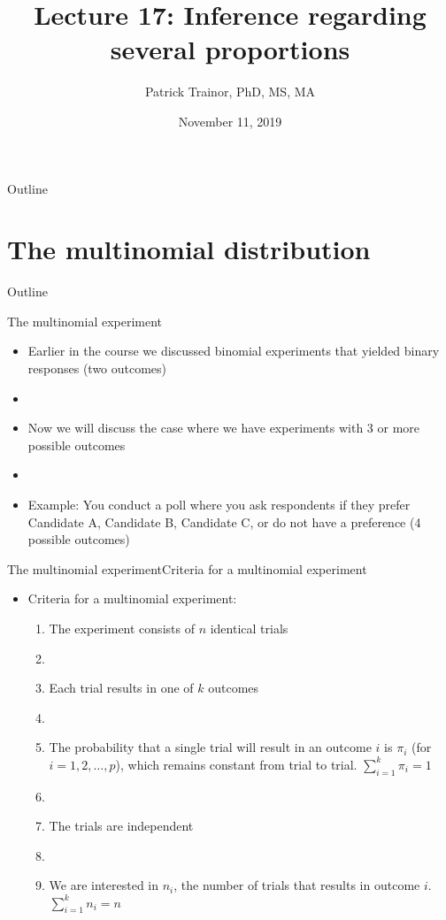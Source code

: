 \documentclass[xcolor=dvipsnames]{beamer}
\title[Lecture 17]{Lecture 17: Inference regarding several proportions}
\author[Patrick Trainor]{Patrick Trainor, PhD, MS, MA}
\institute[NMSU]{New Mexico State University}
\date{November 11, 2019}
\begin{document}
\begin{frame}
\maketitle
\end{frame}

\begin{frame}{Outline}
\tableofcontents[hideallsubsections]
\end{frame}

\section{The multinomial distribution}
\begin{frame}{Outline}
\tableofcontents[currentsection,subsectionstyle=show/shaded/hide]
\end{frame}

\begin{frame}{The multinomial experiment}
	\begin{itemize}
		\item Earlier in the course we discussed binomial experiments that yielded binary responses (two outcomes) \pause
		\item[]
		\item Now we will discuss the case where we have experiments with 3 or more possible outcomes \pause
		\item[]
		\item Example: You conduct a poll where you ask respondents if they prefer Candidate A, Candidate B, Candidate C, or do not have a preference (4 possible outcomes)
	\end{itemize}
\end{frame}

\begin{frame}{The multinomial experiment}{Criteria for a multinomial experiment}
	\begin{itemize}
		\item Criteria for a multinomial experiment: \pause
		\begin{enumerate}
			\item The experiment consists of $n$ identical trials \pause
			\item[]
			\item Each trial results in one of $k$ outcomes \pause
			\item[]
			\item The probability that a single trial will result in an outcome $i$ is $\pi_i$ (for $i=1, 2, \hdots, p$), which remains constant from trial to trial. $\sum_{i=1}^k \pi_i = 1$ \pause
			\item[]
			\item The trials are independent \pause
			\item[]
			\item We are interested in $n_i$, the number of trials that results in outcome $i$. $\sum_{i=1}^k n_i = n$ \pause
		\end{enumerate}
	\end{itemize}
\end{frame}
\end{document}
